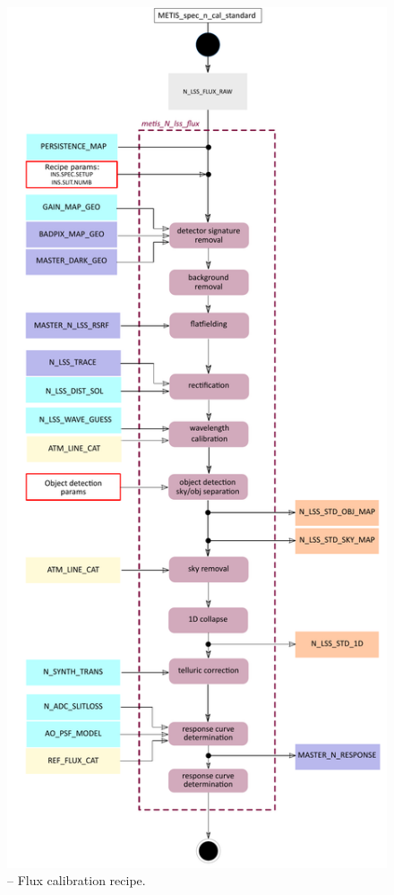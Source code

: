 \begin{figure}[ht]
  \centering
  \includegraphics[width=0.4\textheight]{figures/metis_N_lss_flux_v0.74.pdf}
  \caption[Recipe: ]{ --
    Flux calibration recipe.}
  \label{Fig:rec_N_lss_flux}
\end{figure}
